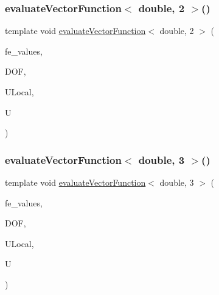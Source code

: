 \subsubsection{\texorpdfstring{evaluate\+Vector\+Function$<$ double, 2 $>$()}{evaluateVectorFunction< double, 2 >()}}
{\footnotesize\ttfamily template void \mbox{\hyperlink{group___evaluation_functions_gab9e164be1be244df81c932426a4bd513}{evaluate\+Vector\+Function}}$<$ double, 2 $>$ (\begin{DoxyParamCaption}\item[{const F\+E\+Values$<$ 2 $>$ \&}]{fe\+\_\+values,  }\item[{unsigned int}]{D\+OF,  }\item[{Table$<$ 1, double $>$ \&}]{U\+Local,  }\item[{Table$<$ 2, double $>$ \&}]{U }\end{DoxyParamCaption})}

\mbox{\label{function_evaluations_8cc_af05742550c00c35879af970241b9f6fc}} 
\subsubsection{\texorpdfstring{evaluate\+Vector\+Function$<$ double, 3 $>$()}{evaluateVectorFunction< double, 3 >()}}
{\footnotesize\ttfamily template void \mbox{\hyperlink{group___evaluation_functions_gab9e164be1be244df81c932426a4bd513}{evaluate\+Vector\+Function}}$<$ double, 3 $>$ (\begin{DoxyParamCaption}\item[{const F\+E\+Values$<$ 3 $>$ \&}]{fe\+\_\+values,  }\item[{unsigned int}]{D\+OF,  }\item[{Table$<$ 1, double $>$ \&}]{U\+Local,  }\item[{Table$<$ 2, double $>$ \&}]{U }\end{DoxyParamCaption})}

\mbox{\label{function_evaluations_8cc_a668c45fc65b525a83192a67dd35571c6}} 
